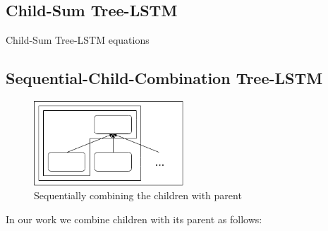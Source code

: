 \documentclass[10pt, a4paper]{article}
\begin{document}
\subsection{Child-Sum Tree-LSTM}
Child-Sum Tree-LSTM equations

	
\subsection{Sequential-Child-Combination Tree-LSTM}

\begin{figure}[h]
	 \begin{center}
    	\includegraphics[width=0.5\textwidth]{sequentialchild}
		\caption{Sequentially combining the children with parent}
	 \end{center}
\end{figure}
	In our work we combine children with its parent as follows:
\end{document}
